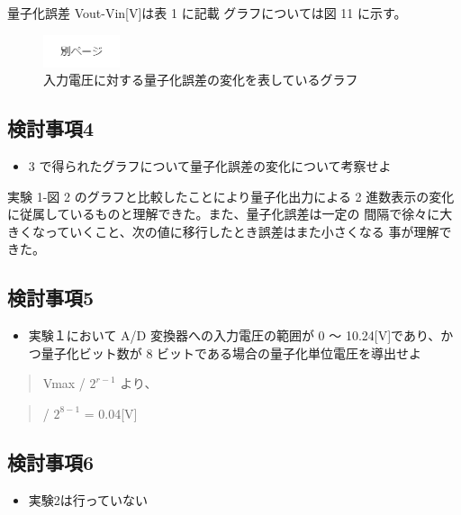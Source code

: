 \documentclass[10pt]{article}
\begin{document}
量子化誤差 Vout-Vin[V]は表 1 に記載 グラフについては図 11 に示す。

\begin{figure}[H]
		\centering
		\includegraphics[width=0.2\textwidth]{page.png}
		\caption{入力電圧に対する量子化誤差の変化を表しているグラフ}
\end{figure}
\pagebreak

\subsection{検討事項4}

\begin{itemize}
    \item  3 で得られたグラフについて量子化誤差の変化について考察せよ 
\end{itemize}

実験 1-図 2 のグラフと比較したことにより量子化出力による 2 進数表示の変化に従属しているものと理解できた。また、量子化誤差は一定の 間隔で徐々に大きくなっていくこと、次の値に移行したとき誤差はまた小さくなる 事が理解できた。 

\subsection{検討事項5}

\begin{itemize}
    \item 実験１において A/D 変換器への入力電圧の範囲が 0 ～ 10.24[V]であり、かつ量子化ビット数が 8 ビットである場合の量子化単位電圧を導出せよ 
\end{itemize}

 \begin{quote}
    \centering
    Vmax / $2^{r-1}$ より、\\
 \end{quote}

\begin{quote}
     / $2^{8-1}$ = 0.04[V] \\
 \end{quote}

 
\subsection{検討事項6}
\begin{itemize}
    \item 実験2は行っていない
\end{itemize}
\end{document}
